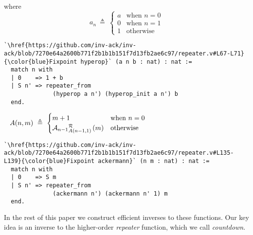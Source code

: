 where
\begin{equation*}
a_n ~ \triangleq ~ \begin{cases}
a & \text{when } n = 0 \\
0 & \text{when } n = 1 \\
1 & \text{otherwise}
\end{cases}
\end{equation*}
\begin{lstlisting} 
`\href{https://github.com/inv-ack/inv-ack/blob/7270e64a2600b771f2b1b1b151f7d13fb2ae6c97/repeater.v#L67-L71}{\color{blue}Fixpoint hyperop}` (a n b : nat) : nat :=
  match n with
  | 0    => 1 + b
  | S n' => repeater_from
              (hyperop a n') (hyperop_init a n') b
  end.
\end{lstlisting}
\begin{equation*}
A(n,m) ~ \triangleq ~ \begin{cases}
m + 1 & \text{when } n = 0 \\
\rf{\mathcal{A}_{n-1}}{A(n-1,1)\ }(m) & \text{otherwise}
\end{cases} \qquad \qquad \qquad \qquad \qquad \qquad \qquad ~ 
\end{equation*}
\begin{lstlisting}
`\href{https://github.com/inv-ack/inv-ack/blob/7270e64a2600b771f2b1b1b151f7d13fb2ae6c97/repeater.v#L135-L139}{\color{blue}Fixpoint ackermann}` (n m : nat) : nat :=
  match n with
  | 0    => S m
  | S n' => repeater_from
              (ackermann n') (ackermann n' 1) m
  end.
\end{lstlisting}
In the rest of this paper we construct efficient inverses to these
functions.  Our key idea is an inverse to the higher-order \emph{repeater} function, which we call \emph{countdown}.

